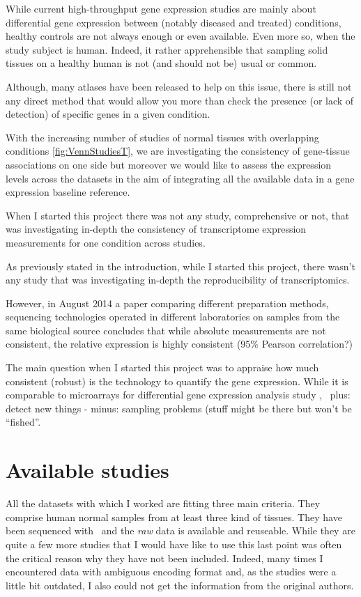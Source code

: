 While current high-throughput gene expression studies are mainly about
differential gene expression between (notably diseased and treated) conditions,
healthy controls are not always enough or even available. Even more so, when the
study subject is human. Indeed, it rather apprehensible that sampling solid
tissues on a healthy human is not (and should not be) usual or common.

Although, many atlases have been released to help on this issue,
there is still not any direct method that would allow you more than check the
presence (or lack of detection) of specific genes in a given condition.

With the increasing number of studies of normal tissues with overlapping conditions
\cref{fig:VennStudiesT}, we are investigating the consistency of gene-tissue
associations on
one side but moreover we would like to assess the expression levels across the
datasets in the aim of integrating all the available data in a gene expression
baseline reference.

When I started this project there was not any study, comprehensive or not, that
was investigating in-depth the consistency of transcriptome expression measurements
for one condition across studies.


As previously stated in the introduction, while I started this project,
there wasn't any study that was investigating in-depth the reproducibility of
transcriptomics.

However, in August 2014 a paper comparing different preparation methods,
sequencing technologies operated in different laboratories
on samples from the same biological source concludes that while absolute
measurements are not consistent, the relative expression is highly consistent
(95\% Pearson correlation?)

The main question when I started this project was to appraise how much consistent
(robust) is the \Rnaseq technology to quantify the gene expression. While it
is comparable to microarrays for differential gene expression analysis study
,
\Rnaseq\ plus: detect new things - minus: sampling problems (stuff might be there
but won't be ``fished''.


\section{Available studies}
\label{sec:Trans_AvailableStudies}

All the datasets with which I worked are fitting three main criteria.
They comprise human normal samples from at least three kind of tissues.
They have been sequenced with \Rnaseq\ and
the \emph{raw} data is available and reuseable.
While they are quite a few more studies that I would have like to use
this last point was often the critical reason why they have not been included.
Indeed, many times I encountered data with ambiguous encoding format and, as the
studies were a little bit outdated,
I also could not get the information from the original authors.

